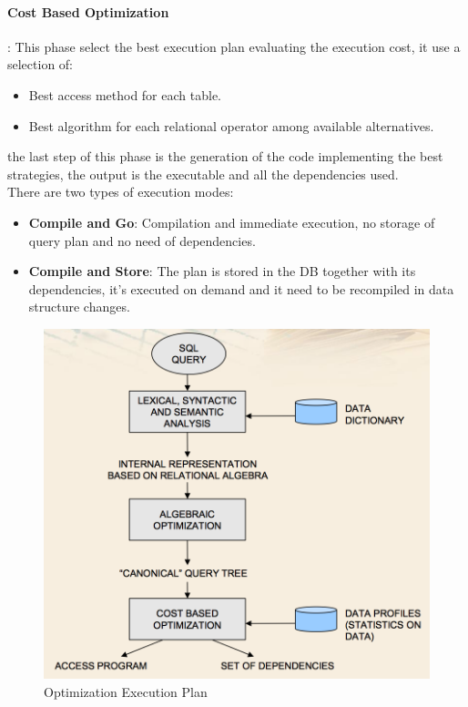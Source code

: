 \documentclass[12pt]{article}
\begin{document}
\paragraph{Cost Based Optimization}: This phase select the best execution plan evaluating the execution cost, it use a selection of:
\begin{itemize}
  \item Best access method for each table.
  \item Best algorithm for each relational operator among available alternatives.
\end{itemize}
the last step of this phase is the generation of the code implementing the best strategies, the output is the executable and all the dependencies used.\\
There are two types of execution modes:
\begin{itemize}
  \item \textbf{Compile and Go}: Compilation and immediate execution, no storage of query plan and no need of dependencies.
  \item \textbf{Compile and Store}: The plan is stored in the DB together with its dependencies, it's executed on demand and it need to be recompiled in data structure changes.
\end{itemize}

\begin{figure}[h!]
  \includegraphics[width=\linewidth]{images/opt_plan.png}
  \caption{Optimization Execution Plan}
  \label{fig:opt_plan}
\end{figure}
\end{document}
